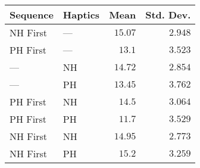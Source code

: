 \begin{tabular}{llrr}
\toprule
 Sequence & Haptics &    Mean &  Std. Dev. \\
\midrule
 NH First &     --- & $15.07$ &    $2.948$ \\
 PH First &     --- &  $13.1$ &    $3.523$ \\
      --- &      NH & $14.72$ &    $2.854$ \\
      --- &      PH & $13.45$ &    $3.762$ \\
 PH First &      NH &  $14.5$ &    $3.064$ \\
 PH First &      PH &  $11.7$ &    $3.529$ \\
 NH First &      NH & $14.95$ &    $2.773$ \\
 NH First &      PH &  $15.2$ &    $3.259$ \\
\bottomrule
\end{tabular}
